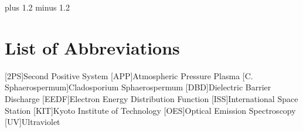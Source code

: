 \documentclass[fontsize=11pt]{scrreprt}
\author{Lorenz Saalmann}
\begin{document}
\font plus 1.2\font
minus 1.2\font



\setcounter{page}{1}



\cleardoublepage

\tableofcontents
\cleardoublepage

\listoffigures
\listoftables
\section*{\huge List of Abbreviations}
\begin{acronym}
  [2PS]{\dotfill Second Positive System}
  [APP]{\dotfill Atmospheric Pressure Plasma}
  [C. Sphaerospermum]{\dotfill Cladosporium Sphaerospermum}
  [DBD]{\dotfill Dielectric Barrier Discharge}
  [EEDF]{\dotfill Electron Energy Distribution Function}
  [ISS]{\dotfill International Space Station}
  [KIT]{\dotfill Kyoto Institute of Technology}
  [OES]{\dotfill Optical Emission Spectroscopy}
  [UV]{\dotfill Ultraviolet}

\end{acronym}
\cleardoublepage

\onehalfspacing

\cleardoublepage









\cleardoublepage
\renewcommand\bibname{References}
{}
\printbibliography
\cleardoublepage


\fontsize{12pt}{12pt}\selectfont
\clearpage
\end{document}

